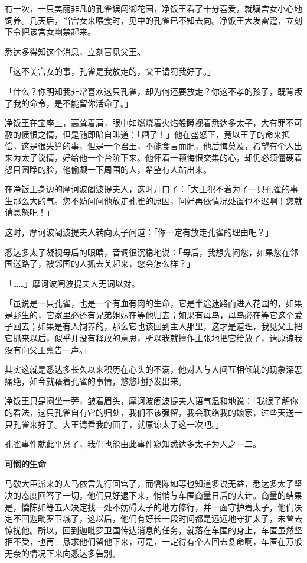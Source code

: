 \documentclass[12pt,twoside,openany]{book}
\newcommand{\mt}[1]{\textbullet \textbf{#1}}
\begin{document}
有一次，一只美丽非凡的孔雀误闯御花园，净饭王看了十分喜爱，就嘱宫女小心地饲养。几天后，当宫女来喂食时，见中的孔雀已不知去向。净饭王大发雷霆，立刻下令把该宫女幽禁起来。

悉达多得知这个消息，立刻晋见父王。

「这不关宫女的事，孔雀是我放走的，父王请罚我好了。」

「什么？你明知我非常喜欢这只孔雀，却为何还要放走？你这不孝的孩子，既背叛了我的命令，是不能留你活命了。」

净饭王在宝座上，高耸着肩，眼中如燃烧着火焰般瞪视着悉达多太子，大有罪不可赦的愤恨之情，但是随即暗自叫道：「糟了！」他在盛怒下，竟以王子的命来抵偿，这是很失算的事，但是一个君王，不能食言而肥，他后悔莫及，希望有个人出来为太子说情，好给他一个台阶下来。他怀着一颗悔恨交集的心，却仍必须僵硬着怒目圆睁的脸，他偷觑一下周围的人，希望有人站出来。

在净饭王身边的摩诃波阇波提夫人，这时开口了：「大王犯不着为了一只孔雀的事生那么大的气。您不妨问问他放走孔雀的原因，问好再依情况处置也不迟啊！您就请息怒吧！」

这时，摩诃波阇波提夫人转向太子问道：「你一定有放走孔雀的理由吧？」

悉达多太子凝视母后的眼睛，音调很沉稳地说：「母后，我想先问您，如果您在邻国迷路了，被邻国的人抓去关起来，您会怎么样？」

「……」摩诃波阇波提夫人无词以对。

「虽说是一只孔雀，也是一个有血有肉的生命，它是半途迷路而进入花园的，如果是野生的，它家里必还有兄弟姐妹在等他归去；如果有母鸟，母鸟必在等它这个爱子回去；如果是有人饲养的，那么它也该回到主人那里，这才是道理，我见父王把它抓来以后，似乎并没有释放的意思，所以我就擅作主张地把它给放了，请原谅我没有向父王禀告一声。」

其实这就是悉达多长久以来积历在心头的不满，他对人与人间互相倾轧的现象深恶痛绝，如今就藉着孔雀的事情，悠悠地抒发出来。

净饭王只是闷坐一旁，皱着眉头，摩诃波阇波提夫人语气温和地说：「我很了解你的看法，这只孔雀自有它的归处，我们不该强留，我会联络我的娘家，过些天送一只孔雀来好了。大王请看我的面子，就原谅太子这一次吧。」

孔雀事件就此平息了，我们也能由此事件窥知悉达多太子为人之一二。

\mt{可悯的生命}

马歇大臣派来的人马依言先行回宫了，而憍陈如等也知道多说无益，悉达多太子坚决的态度回答了一切，他们只好退下来，悄悄与车匿商量日后的大计。商量的结果是，憍陈如等五人决定找一处不妨碍太子的地方修行，并一面守护着太子，他们决定不回迦毗罗卫城了，这以后，他们有好长一段时间都是远远地守护太子，未曾去惊扰他。所以，回到迦毗罗卫国传达消息的任务，就落在车匿的身上，车匿虽然坚拒不受，也再三恳求他们留他下来，可是，一定得有个人回去复命啊，车匿在万般无奈的情况下来向悉达多告别。
\end{document}
